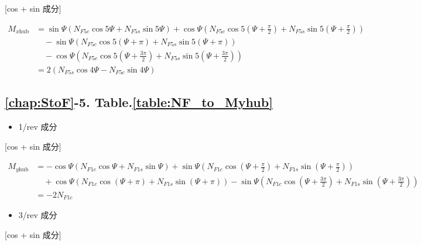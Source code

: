     [cos + sin 成分] 

    \begin{align}
    M_{x\mathrm{hub}}
    &= \sin\Psi
    \left(
    N_{F5c}\cos 5\Psi + N_{F5s}\sin 5\Psi
    \right)
    + \cos\Psi
    \left(
    N_{F5c}\cos 5\left(\Psi + \frac{\pi}{2}\right)
    + N_{F5s}\sin 5\left(\Psi + \frac{\pi}{2}\right)
    \right) \nonumber \\
    &\quad
    - \sin\Psi
    \left(
    N_{F5c}\cos 5(\Psi + \pi) + N_{F5s}\sin 5(\Psi + \pi)
    \right)  \nonumber \\
    &\quad
    - \cos\Psi
    \left(
    N_{F5c}\cos 5\left(\Psi + \frac{3\pi}{2}\right)
    + N_{F5s}\sin 5\left(\Psi + \frac{3\pi}{2}\right)
    \right) \nonumber \\
    &= 2\left(
    N_{F5s}\cos 4\Psi - N_{F5c}\sin 4\Psi
    \right)
    \end{align}
 
    \subsection*{\ref{chap:StoF}-5. Table.\ref{table:NF_to_Myhub}}

    \begin{itemize}
    \item 1/rev 成分
    \end{itemize}

    [cos + sin 成分]

    \begin{align}
    M_{y\mathrm{hub}}
    &= -\cos\Psi
    \left(
    N_{F1c}\cos\Psi + N_{F1s}\sin\Psi
    \right)
    + \sin\Psi
    \left(
    N_{F1c}\cos\left(\Psi + \frac{\pi}{2}\right)
    + N_{F1s}\sin\left(\Psi + \frac{\pi}{2}\right)
    \right) \nonumber \\
    &\quad
    + \cos\Psi
    \left(
    N_{F1c}\cos(\Psi + \pi) + N_{F1s}\sin(\Psi + \pi)
    \right)
    - \sin\Psi
    \left(
    N_{F1c}\cos\left(\Psi + \frac{3\pi}{2}\right)
    + N_{F1s}\sin\left(\Psi + \frac{3\pi}{2}\right)
    \right) \nonumber \\
    &= -2 N_{F1c}
    \end{align}

    \begin{itemize}
    \item 3/rev 成分
    \end{itemize}

    [cos + sin 成分]  

